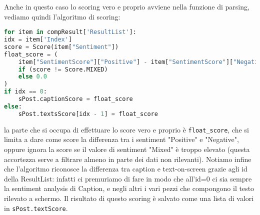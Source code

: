 Anche in questo caso lo scoring vero e proprio avviene nella funzione di parsing, vediamo quindi
l'algoritmo di scoring:
\begin{lstlisting}[language=Python]
for item in compResult['ResultList']:
idx = item['Index']
score = Score(item["Sentiment"])
float_score = (
    item["SentimentScore"]["Positive"] - item["SentimentScore"]["Negative"]
    if (score != Score.MIXED)
    else 0.0
)
if idx == 0:
    sPost.captionScore = float_score
else:
    sPost.textsScore[idx - 1] = float_score
\end{lstlisting}
la parte che si occupa di effettuare lo score vero e proprio è \verb+float_score+, che si limita
a dare come score la differenza tra i sentiment "Positive" e "Negative", oppure ignora la score se 
il valore di sentiment "Mixed" è troppo elevato (questa accortezza serve a filtrare almeno in parte
dei dati non rilevanti).
Notiamo infine che l'algoritmo riconosce la differenza tra caption e text-on-screen grazie agli id
della ResultList: infatti ci premuriamo di fare in modo che all'id=0 ci sia sempre la sentiment 
analysis di Caption, e negli altri i vari pezzi che compongono il testo rilevato a schermo.
Il risultato di questo scoring è salvato come una lista di valori in \verb+sPost.textScore+.
